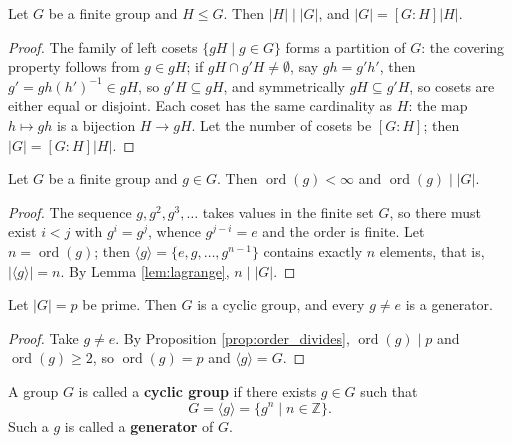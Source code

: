 \begin{lemma}[Lagrange]\label{lem:lagrange}
Let $G$ be a finite group and $H\le G$. Then $|H|\mid |G|$, and $|G|=[G:H]|H|$.
\end{lemma}

\begin{proof}
The family of left cosets $\{gH\mid g\in G\}$ forms a partition of $G$: the covering property follows from $g\in gH$; if $gH\cap g'H\neq\emptyset$, say $gh=g'h'$, then $g'=gh(h')^{-1}\in gH$, so $g'H\subseteq gH$, and symmetrically $gH\subseteq g'H$, so cosets are either equal or disjoint. Each coset has the same cardinality as $H$: the map $h\mapsto gh$ is a bijection $H\to gH$. Let the number of cosets be $[G:H]$; then $|G|=[G:H]|H|$.
\end{proof}

\begin{proposition}\label{prop:order_divides}
Let $G$ be a finite group and $g\in G$. Then $\operatorname{ord}(g)<\infty$ and $\operatorname{ord}(g)\mid |G|$.
\end{proposition}

\begin{proof}
The sequence $g,g^2,g^3,\dots$ takes values in the finite set $G$, so there must exist $i<j$ with $g^i=g^j$, whence $g^{j-i}=e$ and the order is finite. Let $n=\operatorname{ord}(g)$; then $\langle g\rangle=\{e,g,\dots,g^{n-1}\}$ contains exactly $n$ elements, that is, $|\langle g\rangle|=n$. By Lemma \ref{lem:lagrange}, $n\mid |G|$.
\end{proof}

\begin{corollary}\label{cor:prime_order}
Let $|G|=p$ be prime. Then $G$ is a cyclic group, and every $g\neq e$ is a generator.
\end{corollary}

\begin{proof}
Take $g\neq e$. By Proposition \ref{prop:order_divides}, $\operatorname{ord}(g)\mid p$ and $\operatorname{ord}(g)\ge 2$, so $\operatorname{ord}(g)=p$ and $\langle g\rangle=G$.
\end{proof}

\begin{definition}\label{def:cyclic_group}
A group $G$ is called a \textbf{cyclic group} if there exists $g\in G$ such that
\[
G=\langle g\rangle=\{g^n\mid n\in\mathbb{Z}\}.
\]
Such a $g$ is called a \textbf{generator} of $G$.
\end{definition}

